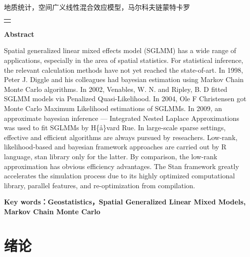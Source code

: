 \documentclass[hyperref, a4paper, UTF8, zihao = -4, linespread = 1.3, table,
notitlepage]{book}
\begin{document}
\par

\normalfont 地质统计，空间广义线性混合效应模型，马尔科夫链蒙特卡罗

\par
\vspace{1cm}

\noindent

\begin{tabular}{l}
\toprule[1pt]\hline
\hspace*{14.5cm}
\end{tabular}

\begin{center}
\bf{ \Large Abstract} \normalfont
\vskip 0.6cm
\end{center}
\par

Spatial generalized linear mixed effects model (SGLMM) has a wide range
of applications, especially in the area of spatial statistics. For
statistical inference, the relevant calculation methods have not yet
reached the state-of-art. In 1998, Peter J. Diggle and his colleagues
had bayesian estimation using Markov Chain Monte Carlo algorithms. In
2002, Venables, W. N. and Ripley, B. D fitted SGLMM models via Penalized
Quasi-Likelihood. In 2004, Ole F Christensen got Monte Carlo Maximum
Likelihood estimations of SGLMMs. In 2009, an approximate bayesian
inference --- Integrated Nested Laplace Approximations was used to fit
SGLMMs by H\{\aa\}vard Rue. In large-scale sparse settings, effective
and efficient algorithms are always pursued by reseachers. Low-rank,
likelihood-based and bayesian framework approaches are carried out by R
language, stan library only for the latter. By comparison, the low-rank
approximation has obvious efficiency advantages. The Stan framework
greatly accelerates the simulation process due to its highly optimized
computational library, parallel features, and re-optimization from
compilation. \medskip

\par

\bf{ Key words：}\normalfont Geostatistics，Spatial Generalized Linear Mixed Models, Markov Chain Monte Carlo

\newpage
\thispagestyle{empty}
\mbox{}
\newpage

\mainmatter

\hypertarget{intro}{%
\chapter{绪论}\label{intro}}
\end{document}
